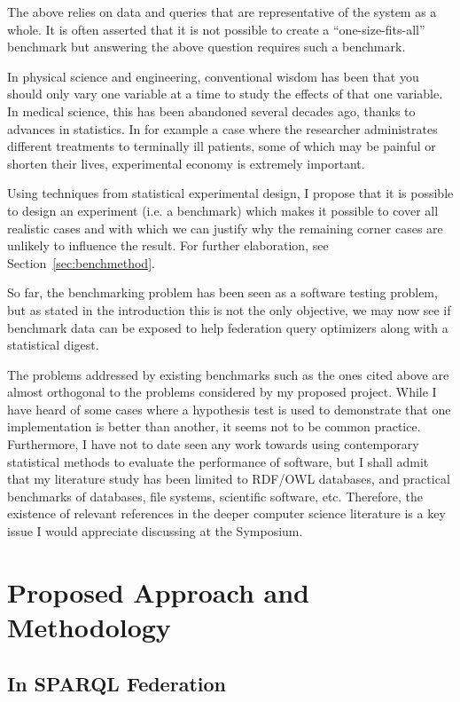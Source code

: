 \documentclass{llncs}
\begin{document}
The above relies on data and queries that are representative of the
system as a whole. It is often asserted that it is not possible to
create a ``one-size-fits-all'' benchmark but answering the above
question requires such a benchmark.

In physical science and engineering, conventional wisdom has been that
you should only vary one variable at a time to study the effects of
that one variable. In medical science, this has been abandoned several
decades ago, thanks to advances in statistics. In for example a case where
the researcher administrates different treatments to terminally ill
patients, some of which may be painful or shorten their lives,
experimental economy is extremely important.

Using techniques from statistical experimental design, I propose
that it is possible to design an experiment (i.e. a benchmark) which
makes it possible to cover all realistic cases and with which we can justify
why the remaining corner cases are unlikely to influence the
result. For further elaboration, see Section~\ref{sec:benchmethod}.

So far, the benchmarking problem has been seen as a software testing
problem, but as stated in the introduction this is not the only
objective, we may now see if benchmark data can be exposed to help
federation query optimizers along with a statistical digest.

The problems addressed by existing benchmarks such as the ones cited
above are almost orthogonal to the problems considered by my proposed
project. While I have heard of some cases where a hypothesis test is
used to demonstrate that one implementation is better than another, it
seems not to be common practice. Furthermore, I have not to date seen
any work towards using contemporary statistical methods to evaluate
the performance of software, but I shall admit that my literature
study has been limited to RDF/OWL databases, and practical benchmarks
of databases, file systems, scientific software, etc. Therefore, the
existence of relevant references in the deeper computer science
literature is a key issue I would appreciate discussing at the
Symposium.



\section{Proposed Approach and Methodology}

\subsection{In SPARQL Federation}
\end{document}
